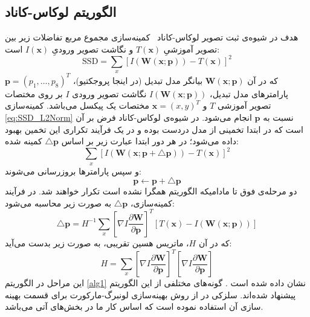 \documentclass[conference]{IEEEtran-ModifiedForMVIP}
\newcommand{\warp}{\mathbf{W}(\mathbf{x};\mathbf{p})}
\newcommand{\IWarp}{I(\mathbf{W}(\mathbf{x};\mathbf{p}))}
\newcommand{\roundB}[2]{\frac{\partial{\mathbf{#1}}}{\partial{\mathbf{#2}}}}
\begin{document}
\subsection{الگوریتم لوکاس-کاناد}
 هدف در شیوه‌ی ثبت تصویر لوکاس-کاناد~\cite{Lucas81iterative} کمینه‌سازی مجموع مربع تفاضلات زیر بین تصویر آموزشیِ $T(\mathbf{x})$ و نگاشت تصویر ورودیِ $I(\mathbf{x})$ است:
 \begin{equation}\label{eq:SSD_L2Norm}
    \textrm{SSD}=\sum_x[\IWarp-T(\mathbf{x})]^2
\end{equation}
که در آن $\warp$ بیانگر مدل تبدیل‌ (در اینجا پروجکتیو)، $\mathbf{p}=(p_1,\dots,p_8)^T$ پارامترهای مدل تبدیل، $\IWarp$ نگاشت تصویر ورودی $I$ بر روی مختصات تصویر آموزشی $T$ و $\mathbf{x} =(x,y)^T$ مختصات یک پیکسل می‌باشد.
 کمینه‌سازی \eqref{eq:SSD_L2Norm} نسبت به $\mathbf{p}$ انجام می‌شود. 
در شیوه‌ی لوکاس-کاناد فرض بر آن است که در ابتدا تخمینی از مدل دردست بوده و در یک فرآیند تکراری این تخمین بهبود داده می‌شود؛
در هر دور ابتدا عبارت زیر بر اساس $\triangle\mathbf{p}$ کمینه شده:
\begin{equation}\label{eq:SSD_L2Norm_deltap}
    \sum_x[I(\mathbf{W}(\mathbf{x;\mathbf{p+\triangle p}}))-T(\mathbf{x})]^2
\end{equation}
 و سپس پارامترها بروزرسانی می‌شوند:
\begin{equation}
    \mathbf{p}\leftarrow\mathbf{p+\triangle p}
\end{equation}
دو مرحله‌ی فوق تا مادامیکه الگوریتم همگرا نشده است تکرار خواهند شد. در فرآیند کمینه‌سازی، $\mathbf{\triangle p}$ به صورت زیر محاسبه می‌شود:
\begin{equation}\label{eq:deltap}
    \triangle\mathbf{p} = H^{-1} \sum_x[\nabla I\roundB{W}{p}]^T[T(\mathbf{x})-\IWarp]
\end{equation}
که در آن $H$، ماتریس هسین تقریبی، به صورت زیر بدست می‌آید:
\begin{equation}\label{eq:Hessian}
    H = \sum_x[\nabla I\roundB{W}{p}]^T[\nabla I\roundB{W}{p}]
\end{equation}
این مراحل در الگوریتم \ref{alg1} نشان داده شده است \cite{Baker04lucas-kanade20part1}.
گونه‌های مختلفی از این الگوریتم پیشنهاد شده‌اند. سلزکی در \cite{Szeliski96video} از روش بهینه‌سازی لونبرگ-مارکورت برای قسمت بهینه سازی آن استفاده نموده است که اساس کار ما در بخش‌های آتی می‌باشد.
\end{document}
